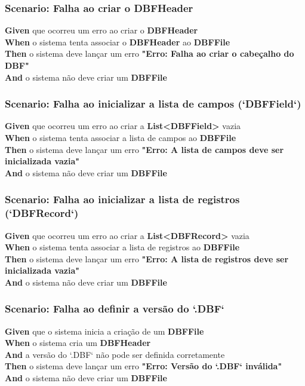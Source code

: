 \subsubsection{Scenario: Falha ao criar o DBFHeader}
\textbf{Given} que ocorreu um erro ao criar o \textbf{DBFHeader} \\
\textbf{When} o sistema tenta associar o \textbf{DBFHeader} ao \textbf{DBFFile} \\
\textbf{Then} o sistema deve lançar um erro \textbf{"Erro: Falha ao criar o cabeçalho do DBF"} \\
\textbf{And} o sistema não deve criar um \textbf{DBFFile} \\

\subsubsection{Scenario: Falha ao inicializar a lista de campos (`DBFField`)}
\textbf{Given} que ocorreu um erro ao criar a \textbf{List<DBFField>} vazia \\
\textbf{When} o sistema tenta associar a lista de campos ao \textbf{DBFFile} \\
\textbf{Then} o sistema deve lançar um erro \textbf{"Erro: A lista de campos deve ser inicializada vazia"} \\
\textbf{And} o sistema não deve criar um \textbf{DBFFile} \\

\subsubsection{Scenario: Falha ao inicializar a lista de registros (`DBFRecord`)}
\textbf{Given} que ocorreu um erro ao criar a \textbf{List<DBFRecord>} vazia \\
\textbf{When} o sistema tenta associar a lista de registros ao \textbf{DBFFile} \\
\textbf{Then} o sistema deve lançar um erro \textbf{"Erro: A lista de registros deve ser inicializada vazia"} \\
\textbf{And} o sistema não deve criar um \textbf{DBFFile} \\

\subsubsection{Scenario: Falha ao definir a versão do `.DBF`}
\textbf{Given} que o sistema inicia a criação de um \textbf{DBFFile} \\
\textbf{When} o sistema cria um \textbf{DBFHeader} \\
\textbf{And} a versão do `.DBF` não pode ser definida corretamente \\
\textbf{Then} o sistema deve lançar um erro \textbf{"Erro: Versão do `.DBF` inválida"} \\
\textbf{And} o sistema não deve criar um \textbf{DBFFile} \\

